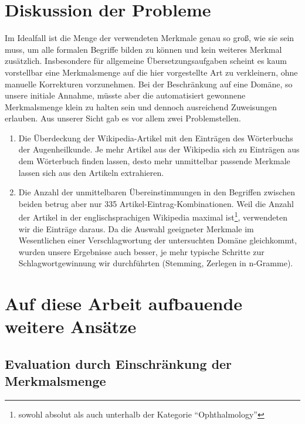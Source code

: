 \documentclass[pagesize,DIV=calc,12pt,final]{scrreprt}
\begin{document}

\section{Diskussion der Probleme}

Im Idealfall ist die Menge der verwendeten Merkmale genau so groß, wie sie sein muss, um alle formalen Begriffe bilden zu können und kein weiteres Merkmal zusätzlich. 
Insbesondere für allgemeine Übersetzungsaufgaben scheint es kaum vorstellbar eine Merkmalsmenge auf die hier vorgestellte Art zu verkleinern, ohne manuelle Korrekturen vorzunehmen. 
Bei der Beschränkung auf eine Domäne, so unsere initiale Annahme, müsste aber die automatisiert gewonnene Merkmalsmenge klein zu halten sein und dennoch ausreichend Zuweisungen erlauben. 
Aus unserer Sicht gab es vor allem zwei Problemstellen. 
\begin{enumerate}
\item Die Überdeckung der Wikipedia-Artikel mit den Einträgen des Wörterbuchs der Augenheilkunde. 
Je mehr Artikel aus der Wikipedia sich zu Einträgen aus dem Wörterbuch finden lassen, desto mehr unmittelbar passende Merkmale lassen sich aus den Artikeln extrahieren. 
\item Die Anzahl der unmittelbaren Übereinstimmungen in den Begriffen zwischen beiden betrug aber nur 335 Artikel-Eintrag-Kombinationen. 
    Weil die Anzahl der Artikel in der englischsprachigen Wikipedia maximal ist\footnote{sowohl absolut als auch unterhalb der Kategorie \enquote{Ophthalmology}}, verwendeten wir die Einträge daraus. 
Da die Auswahl geeigneter Merkmale im Wesentlichen einer Verschlagwortung der untersuchten Domäne gleichkommt, wurden unsere Ergebnisse auch besser, je mehr typische Schritte zur Schlagwortgewinnung wir durchführten (Stemming, Zerlegen in n-Gramme). 
\end{enumerate}

\section{Auf diese Arbeit aufbauende weitere Ansätze}
\subsection{Evaluation durch Einschränkung der Merkmalsmenge}
\end{document}
